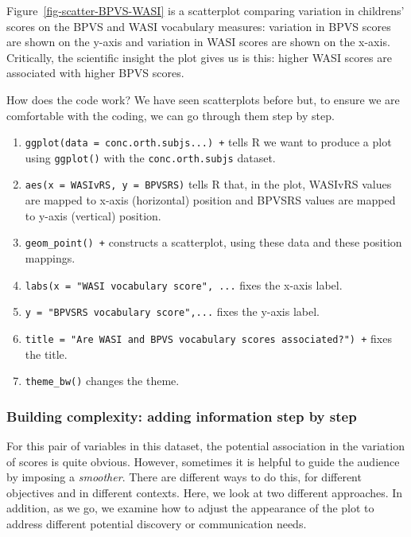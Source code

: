 \documentclass[
  letterpaper,
  DIV=11,
  numbers=noendperiod]{scrreprt}
\providecommand{\tightlist}{%
  \setlength{\itemsep}{0pt}\setlength{\parskip}{0pt}}\usepackage{longtable,booktabs,array}
\begin{document}
Figure~\ref{fig-scatter-BPVS-WASI} is a scatterplot comparing variation
in childrens' scores on the BPVS and WASI vocabulary measures: variation
in BPVS scores are shown on the y-axis and variation in WASI scores are
shown on the x-axis. Critically, the scientific insight the plot gives
us is this: higher WASI scores are associated with higher BPVS scores.

How does the code work? We have seen scatterplots before but, to ensure
we are comfortable with the coding, we can go through them step by step.

\begin{enumerate}
\def\labelenumi{\arabic{enumi}.}
\tightlist
\item
  \texttt{ggplot(data\ =\ conc.orth.subjs...)\ +} tells R we want to
  produce a plot using \texttt{ggplot()} with the
  \texttt{conc.orth.subjs} dataset.
\item
  \texttt{aes(x\ =\ WASIvRS,\ y\ =\ BPVSRS)} tells R that, in the plot,
  WASIvRS values are mapped to x-axis (horizontal) position and BPVSRS
  values are mapped to y-axis (vertical) position.
\item
  \texttt{geom\_point()\ +} constructs a scatterplot, using these data
  and these position mappings.
\item
  \texttt{labs(x\ =\ "WASI\ vocabulary\ score",\ ...} fixes the x-axis
  label.
\item
  \texttt{y\ =\ "BPVSRS\ vocabulary\ score",...} fixes the y-axis label.
\item
  \texttt{title\ =\ "Are\ WASI\ and\ BPVS\ vocabulary\ scores\ associated?")\ +}
  fixes the title.
\item
  \texttt{theme\_bw()} changes the theme.
\end{enumerate}

\hypertarget{sec-scatter-building}{%
\subsubsection{Building complexity: adding information step by
step}\label{sec-scatter-building}}

For this pair of variables in this dataset, the potential association in
the variation of scores is quite obvious. However, sometimes it is
helpful to guide the audience by imposing a \emph{smoother}. There are
different ways to do this, for different objectives and in different
contexts. Here, we look at two different approaches. In addition, as we
go, we examine how to adjust the appearance of the plot to address
different potential discovery or communication needs.
\end{document}
